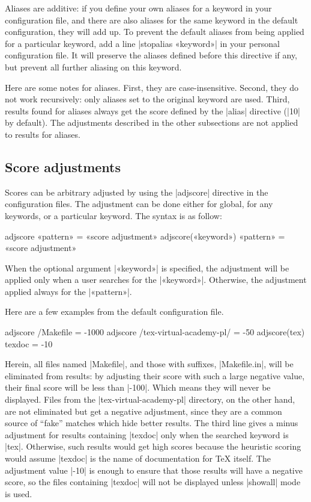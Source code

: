 \documentclass{texdoc-doc}
\begin{document}
Aliases are additive: if you define your own aliases for a keyword in your
configuration file, and there are also aliases for the same keyword in the
default configuration, they will add up. To prevent the default aliases from
being applied for a particular keyword, add a line |stopalias «keyword»| in
your personal configuration file. It will preserve the aliases defined before
this directive if any, but prevent all further aliasing on this keyword.

Here are some notes for aliases. First, they are case-insensitive. Second, they
do not work recursively: only aliases set to the original keyword are used.
Third, results found for aliases always get the score defined by the |alias|
directive (|10| by default). The adjustments described in the other subsections
are not applied to results for aliases.

\subsection{Score adjustments}
\label{sec:score}

Scores can be arbitrary adjusted by using the |adjscore| directive in the
configuration files. The adjustment can be done either for global, \ie for any
keywords, or a particular keyword. The syntax is as follow:
%
\begin{htcode}
adjscore «pattern» = «score adjustment»
adjscore(«keyword») «pattern» = «score adjustment»
\end{htcode}
%
When the optional argument |«keyword»| is specified, the adjustment will be
applied only when a user searches for the |«keyword»|. Otherwise, the
adjustment applied always for the |«pattern»|.

Here are a few examples from the default configuration file.

\begin{htcode}
adjscore /Makefile = -1000
adjscore /tex-virtual-academy-pl/ = -50
adjscore(tex) texdoc = -10
\end{htcode}
%
Herein, all files named |Makefile|, and those with suffixes, \eg |Makefile.in|,
will be eliminated from results: by adjusting their score with such a large
negative value, their final score will be less than |-100|. Which means they
will never be displayed. Files from the |tex-virtual-academy-pl| directory, on
the other hand, are not eliminated but get a negative adjustment, since they
are a common source of ``fake'' matches which hide better results. The third
line gives a minus adjustment for results containing |texdoc| only when the
searched keyword is |tex|. Otherwise, such results would get high scores
because the heuristic scoring would assume |texdoc| is the name of
documentation for {\TeX} itself. The adjustment value |-10| is enough to ensure
that those results will have a negative score, so the files containing |texdoc|
will not be displayed unless |showall| mode is used.
\end{document}
